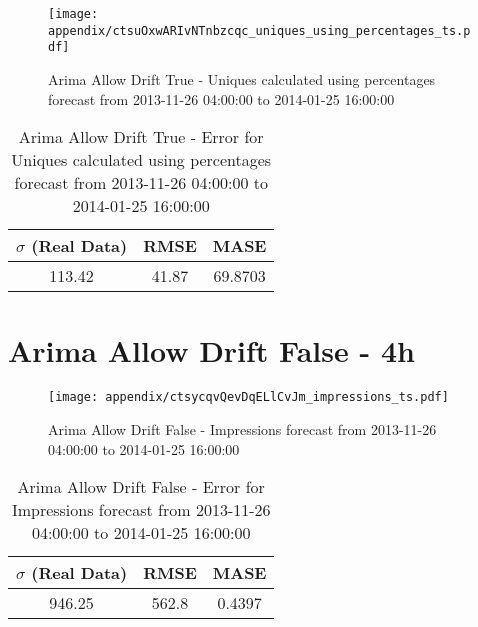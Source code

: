 \begin{figure}[H] \begin{center} \leavevmode
\texttt{[image: appendix/ctsuOxwARIvNTnbzcqc\_uniques\_using\_percentages\_ts.pdf]} \caption{
Arima Allow Drift True - Uniques calculated using percentages forecast from 2013-11-26 04:00:00 to 2014-01-25 16:00:00} \label{fig:appendix/ctsuOxwARIvNTnbzcqc_uniques_using_percentages_ts.pdf} \end{center}
\end{figure}

\begin{table}[H]
\centering
\footnotesize
\begin{tabular}{ccc}
$\sigma$ (Real Data) & RMSE & MASE   \\ \hline
113.42 & 41.87 & 69.8703 \\
\end{tabular}

\vspace{0.5cm}

\caption{
Arima Allow Drift True - Error for Uniques calculated using percentages forecast from 2013-11-26 04:00:00 to 2014-01-25 16:00:00}
\end{table}

\section{Arima Allow Drift False - 4h}
\begin{figure}[H] \begin{center} \leavevmode
\texttt{[image: appendix/ctsycqvQevDqELlCvJm\_impressions\_ts.pdf]} \caption{
Arima Allow Drift False - Impressions forecast from 2013-11-26 04:00:00 to 2014-01-25 16:00:00} \label{fig:appendix/ctsycqvQevDqELlCvJm_impressions_ts.pdf} \end{center}
\end{figure}

\begin{table}[H]
\centering
\footnotesize
\begin{tabular}{ccc}
$\sigma$ (Real Data) & RMSE & MASE   \\ \hline
946.25 & 562.8 & 0.4397 \\
\end{tabular}

\vspace{0.5cm}

\caption{
Arima Allow Drift False - Error for Impressions forecast from 2013-11-26 04:00:00 to 2014-01-25 16:00:00}
\end{table}

